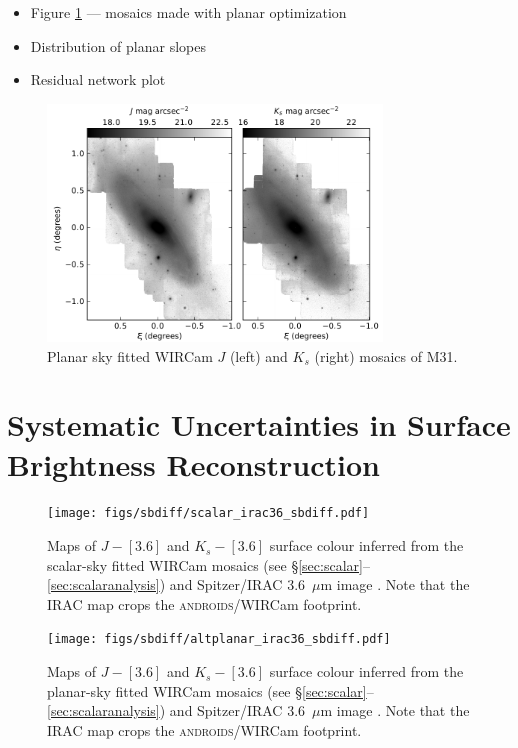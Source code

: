 \documentclass[iop]{emulateapj}
\newcommand{\androids}{\textsc{androids}}
\begin{document}
\begin{itemize}
	\item Figure \ref{fig:planar_mosaics} --- mosaics made with planar optimization
	\item Distribution of planar slopes
	\item Residual network plot
\end{itemize}

\begin{figure}[t]
	\centering
		\includegraphics[width=3.5in]{figs/planar_mosaics}
	\caption{Planar sky fitted WIRCam $J$ (left) and $K_s$ (right) mosaics of M31.}
	\label{fig:planar_mosaics}
\end{figure}

\section{Systematic Uncertainties in Surface Brightness Reconstruction}
\label{sec:systematics}

\begin{figure}[t]
    \centering
        \texttt{[image: figs/sbdiff/scalar\_irac36\_sbdiff.pdf]}
    \caption{Maps of $J-[3.6]$ and $K_s-[3.6]$ surface colour inferred from the scalar-sky fitted WIRCam mosaics (see \S\ref{sec:scalar}--\ref{sec:scalaranalysis}) and Spitzer/IRAC 3.6~$\mu$m image \citep{Barmby:2006}. Note that the IRAC map crops the \androids/WIRCam footprint.}
    \label{fig:scalar_irac36_sbdiff}
\end{figure}

\begin{figure}[t]
    \centering
        \texttt{[image: figs/sbdiff/altplanar\_irac36\_sbdiff.pdf]}
    \caption{Maps of $J-[3.6]$ and $K_s-[3.6]$ surface colour inferred from the planar-sky fitted WIRCam mosaics (see \S\ref{sec:scalar}--\ref{sec:scalaranalysis}) and Spitzer/IRAC 3.6~$\mu$m image \citep{Barmby:2006}. Note that the IRAC map crops the \androids/WIRCam footprint.}
    \label{fig:altplanar_irac36_sbdiff}
\end{figure}
\end{document}
